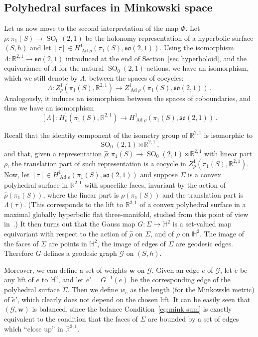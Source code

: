\documentclass[11pt]{article}
\theoremstyle{definition}
\numberwithin{equation}{section}
\numberwithin{figure}{section}
\numberwithin{table}{section}
\newcommand{\Hyp}{\mathbb{H}}
\newcommand{\R}{{\mathbb R}}
\newcommand{\so}{\mathfrak{so}}
\DeclareMathOperator{\Ad}{Ad}
\DeclareMathOperator{\SO}{SO}
\begin{document}
\subsection{Polyhedral surfaces in Minkowski space} Let us now move to the second interpretation of the map $\Phi$. Let $\rho:\pi_1(S)\to\SO_0(2,1)$ be the holonomy representation of a hyperbolic surface $(S,h)$ and let $[\tau]\in H^1_{\Ad\rho}(\pi_1(S),\so(2,1))$. Using the isomorphism $\Lambda:\R^{2,1}\to\so(2,1)$ introduced at the end of Section~\ref{sec hyperboloid}, and the equivariance of $\Lambda$ for the natural $\SO_0(2,1)$-actions, we have an isomorphism, which we still denote by $\Lambda$, between the spaces of cocycles:
\[
\Lambda:{Z}^1_{\rho}\left(\pi_1(S),\R^{2,1}\right)\to {Z}^1_{\Ad\rho}\left(\pi_1(S),\so(2,1)\right)\,.
\]
Analogously, it induces an isomorphism between the spaces of coboundaries, and thus we have an isomorphism
\[
[\Lambda]:H^1_{\rho}\left(\pi_1(S),\R^{2,1}\right)\to H^1_{\Ad\rho}\left(\pi_1(S),\so(2,1)\right)\,.
\]

Recall that the identity component of the isometry group of $\R^{2,1}$ is isomorphic to
\[
\SO_0(2,1)\rtimes\R^{2,1}\,,
\]
and that, given a representation $\widehat\rho:\pi_1(S)\to \SO_0(2,1)\rtimes\R^{2,1}$ with linear part $\rho$, the translation part of such representation is a cocycle in $Z^1_{\rho}(\pi_1(S),\R^{2,1})$. Now, let $[\tau]\in H^1_{\Ad\rho}(\pi_1(S),\so(2,1))$ and suppose $\Sigma$ is a convex polyhedral surface in $\R^{2,1}$ with spacelike faces, invariant by the action of $\widehat\rho(\pi_1(S))$, where the linear part is $\rho(\pi_1(S))$ and the translation part is $\Lambda(\tau)$. (This corresponds to the lift to $\R^{2,1}$ of a convex polyhedral surface in a maximal globally hyperbolic flat three-manifold, studied from this point of view in~\cite{mess}.) It then turns out that the Gauss map $G:\Sigma\to\Hyp^2$ is a set-valued map equivariant with respect to the action of $\widehat\rho$ on $\Sigma$, and of $\rho$ on $\Hyp^2$. The image of the faces of $\Sigma$ are points in $\Hyp^2$, the image of edges of $\Sigma$ are geodesic edges. Therefore $G$ defines a geodesic graph $\mathcal{G}$ on $(S,h)$.

Moreover, we can define a set of weights $\mathbf w$ on $\mathcal{G}$. Given an edge $e$ of $\mathcal{G}$, let $\widetilde e$ be any lift of $e$ to $\Hyp^2$, and let $\widetilde e'=G^{-1}(\widetilde e)$ be the corresponding edge of the polyhedral surface $\Sigma$. Then we define $w_e$ as the length (for the Minkowski metric) of $\widetilde e'$, which clearly does not depend on the chosen lift. It can be easily seen that $(\mathcal{G},\mathbf w)$ is balanced, since the balance Condition~\eqref{eq:mink sum} is exactly equivalent to the condition that the faces of $\Sigma$ are bounded by a set of edges which ``close up'' in $\R^{2,1}$.
\end{document}
